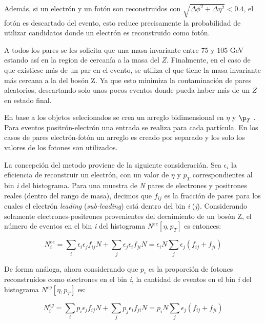 Además, si un electrón y un fotón son reconstruidos con $\sqrt{\Delta\phi^{2}+\Delta\eta^{2}}<0.4$, el fotón es descartado del evento, esto reduce precisamente la probabilidad de utilizar candidatos donde un electrón es reconstruido como fotón. 

A todos los pares se les solicita que una masa invariante entre $75$ y $105$ GeV  estando así en la region de cercanía a la masa del $Z$. Finalmente, en el caso de que existiese más de un par en el evento, se utiliza el que tiene la masa invariante más cercana a la del bosón Z. Ya que esto minimiza la contaminación de pares aleatorios, descartando solo unos pocos eventos donde pueda haber más de un $Z$ en estado final.


En base a los objetos selecionados se crea un arreglo bidimensional en  $\eta$ y $\p_{T}$ . Para eventos positrón-electrón una entrada se realiza para cada partícula. En los casos de pares electrón-fotón un arreglo es creado por separado y los solo los valores de los fotones son utilizados.

La concepción del metodo proviene de la siguiente consideración. Sea $\epsilon_{i}$ la eficiencia de reconstruir un electrón, con un valor de $\eta$ y $p_{T}$ correspondientes al bin \textit{i} del histograma. Para una muestra de \textit{N} pares de electrones y positrones reales (dentro del rango de masa), decimos que $f_{ij}$ es la fracción de pares para los cuales el electrón \textit{leading} (\textit{sub-leading}) está dentro del bin \textit{i} (\textit{j}). Considerando solamente electrones-positrones provenientes del decaimiento de un bosón Z, el número de eventos en el bin \textit{i} del histograma $N^{ee}[\eta , p_{T}]$ es entonces:

\begin{equation}
N_{i}^{ee} = \sum_{i}\epsilon_{i}\epsilon_{j}f_{ij}N + \sum_{j}\epsilon_{j}\epsilon_{i}f_{ji}N = \epsilon_{i}N\sum_{j}\epsilon_{j}(f_{ij}+f_{ji})
\end{equation}

De forma análoga, ahora considerando que $p_{i}$ es la proporción de fotones reconstruídos como electrones en el bin \textit{i}, la cantidad de eventos en el bin \textit{i} del histograma $N^{eg}[\eta , p_{T}]$ es:

\begin{equation}
N_{i}^{eg} = \sum_{i}p_{i}\epsilon_{j}f_{ij}N + \sum_{j}p_{j}\epsilon_{i}f_{ji}N = p_{i}N\sum_{j}\epsilon_{j}(f_{ij}+f_{ji})
\end{equation}

